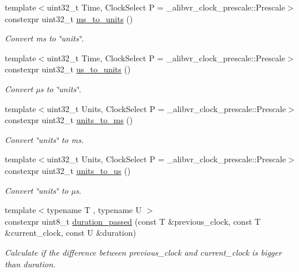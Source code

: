\begin{DoxyCompactItemize}
{\footnotesize template$<$uint32\+\_\+t Time, Clock\+Select P = \+\_\+alibvr\+\_\+clock\+\_\+prescale\+::\+Prescale$>$ }\\constexpr uint32\+\_\+t \hyperlink{namespaceclock_ae159a2e83f7b30eeafe3d5be8a3f5ef6}{ms\+\_\+to\+\_\+units} ()
\begin{DoxyCompactList}\small\item\em Convert ms to \char`\"{}units\char`\"{}. \end{DoxyCompactList}\item 
{\footnotesize template$<$uint32\+\_\+t Time, Clock\+Select P = \+\_\+alibvr\+\_\+clock\+\_\+prescale\+::\+Prescale$>$ }\\constexpr uint32\+\_\+t \hyperlink{namespaceclock_a058555acfdfbc406daf1cb9331b0bc6f}{us\+\_\+to\+\_\+units} ()
\begin{DoxyCompactList}\small\item\em Convert µs to \char`\"{}units\char`\"{}. \end{DoxyCompactList}\item 
{\footnotesize template$<$uint32\+\_\+t Units, Clock\+Select P = \+\_\+alibvr\+\_\+clock\+\_\+prescale\+::\+Prescale$>$ }\\constexpr uint32\+\_\+t \hyperlink{namespaceclock_a475b3551d89e7a345492a61f70830bd8}{units\+\_\+to\+\_\+ms} ()
\begin{DoxyCompactList}\small\item\em Convert \char`\"{}units\char`\"{} to ms. \end{DoxyCompactList}\item 
{\footnotesize template$<$uint32\+\_\+t Units, Clock\+Select P = \+\_\+alibvr\+\_\+clock\+\_\+prescale\+::\+Prescale$>$ }\\constexpr uint32\+\_\+t \hyperlink{namespaceclock_a320b3614df868e901b2f022f70a3d8ae}{units\+\_\+to\+\_\+us} ()
\begin{DoxyCompactList}\small\item\em Convert \char`\"{}units\char`\"{} to µs. \end{DoxyCompactList}\item 
{\footnotesize template$<$typename T , typename U $>$ }\\constexpr uint8\+\_\+t \hyperlink{namespaceclock_a2818f7b058e27771426f39c7aa0365cd}{duration\+\_\+passed} (const T \&previous\+\_\+clock, const T \&current\+\_\+clock, const U \&duration)
\begin{DoxyCompactList}\small\item\em Calculate if the difference between previous\+\_\+clock and current\+\_\+clock is bigger than duration. \end{DoxyCompactList}\item 

\end{DoxyCompactItemize}
